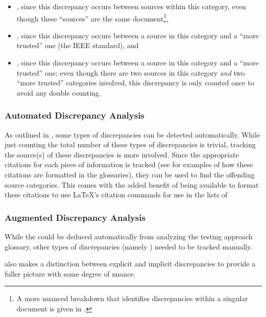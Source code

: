 \begin{itemize}
    \item \textbf{}, since this discrepancy occurs between
          sources within this category, even though these ``sources'' are the
          same document\footnote{A more nuanced breakdown that identifies
              discrepancies within a singular document is given in
              .},
    \item \textbf{}, since this discrepancy occurs between a
          source in this category and a ``more trusted'' one
          (the IEEE standard), and
    \item \textbf{}, since this discrepancy occurs between a
          source in this category and a ``more trusted'' one; even though there
          are two sources in this category \emph{and} two ``more trusted''
          categories involved, this discrepancy is only counted once to avoid
          any double counting.
\end{itemize}

\subsubsection{Automated Discrepancy Analysis}
\label{auto-discrep-analysis}

As outlined in , some types of discrepancies can be detected
automatically. While just counting the total number of these types of
discrepancies is trivial, tracking the source(s) of these discrepancies is more
involved. Since the appropriate citations for each piece of information is
tracked (see  for examples of
how these citations are formatted in the glossaries), they can be used to find
the offending source categories. This comes with the added benefit of being
available to format these citations to use \LaTeX{}'s citation commands for use
in the lists of \autoDiscreps[.]{}


\subsubsection{Augmented Discrepancy Analysis}
\label{aug-discrep-analysis}
While the \autoDiscreps{} could be deduced automatically from analyzing the
testing approach glossary, other types of discrepancies (namely
) needed to be tracked manually.

 also makes a distinction between explicit and implicit%
discrepancies to provide a fuller picture with some degree of nuance.